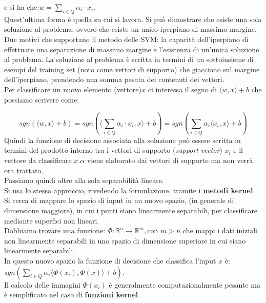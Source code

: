 e si ha che:$w=\displaystyle \sum_{i\in Q}\alpha_i \cdot x_i$. \\
Quest’ultima forma è quella su cui si lavora. Si può dimostrare che esiste una sola soluzione al problema, ovvero che esiste un unico iperpiano di massimo margine.
Due motivi che supportano il metodo delle SVM: la capacità dell’iperpiano di effettuare una separazione di massimo margine e l’esistenza di un’unica soluzione al problema. La soluzione al problema è scritta in termini di un sottoinsieme di esempi del training set (noto come vettori di supporto) che giacciono sul margine dell’iperpiano, prendendo una somma pesata dei contenuti dei vettori.\\

Per classificare un nuovo elemento (vettore)$x$ ci interessa il segno di $\langle w,x\rangle+b$ che possiamo scrivere come:

$$sgn(\langle w,x\rangle+b)=sgn\displaystyle \left(\Big\langle\sum_{i\in Q}\alpha_i\cdot  x_i,x\Big\rangle +b\right)=sgn\left(\sum_{i\in Q}\alpha_i\langle x_i,x\rangle +b\right)$$
Quindi la funzione di decisione associata alla soluzione può essere scritta in termini del prodotto interno tra i vettori di supporto (\textit{support vector}) $x_i$ e il vettore da classificare $x$.$\alpha$ viene elaborato dai vettori di supporto ma non verrà ora trattato.\\

Passiamo quindi oltre alla sola separabilità lineare.\\

Si usa lo stesso approccio, rivedendo la formulazione, tramite i \textbf{metodi kernel}. Si cerca di mappare lo spazio di input in un nuovo spazio, (in generale di dimensione maggiore), in cui i punti siano linearmente separabili, per classificare mediante superfici non lineari.\\

Dobbiamo trovare una funzione: $\Phi:\mathbb{R}^n\to \mathbb{R}^m,\mbox{con }m>n$ che mappi i dati iniziali non linearmente separabili in uno spazio di dimensione
superiore in cui siano linearmente separabili.\\
In questo nuovo spazio la funzione di decisione che classifica l'input $x$ è: $sgn\left(\displaystyle \sum_{i\in Q}\alpha_i\langle \Phi(x_i),\Phi(x)\rangle+b\right)$. \\
Il calcolo delle immagini $\Phi(x_i)$ è generalmente computazionalmente pesante ma è semplificato nel caso di \textbf{funzioni kernel}.
